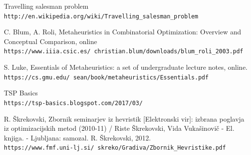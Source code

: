 \documentclass[12pt,a4paper]{amsart}
\theoremstyle{definition} %
\theoremstyle{plain} %
\begin{document}
\pagebreak
\begin{thebibliography}{99}

Travelling salesman problem
\\\texttt{http://en.wikipedia.org/wiki/Travelling\_salesman\_problem}

\bibitem{}
C. Blum, A. Roli, Metaheuristics in Combinatorial Optimization: Overview and Conceptual
Comparison, online
\\\texttt{https://www.iiia.csic.es/~christian.blum/downloads/blum\_roli\_2003.pdf}

\bibitem{}
S. Luke, Essentials of Metaheuristics: a set of undergraduate lecture notes, online.
\\\texttt{https://cs.gmu.edu/~sean/book/metaheuristics/Essentials.pdf}

\bibitem{}
TSP Basics
\\\texttt{https://tsp-basics.blogspot.com/2017/03/}

\bibitem{}
R. Škrekovski, Zbornik seminarjev iz hevristik [Elektronski vir]: izbrana poglavja iz optimizacijskih metod (2010-11) / Riste Škrekovski, Vida Vukašinovič - El. knjiga. - Ljubljana: samozal. R. Škrekovski, 2012. 
\\\texttt{https://www.fmf.uni-lj.si/~skreko/Gradiva/Zbornik\_Hevristike.pdf}


\end{thebibliography}
\end{document}
